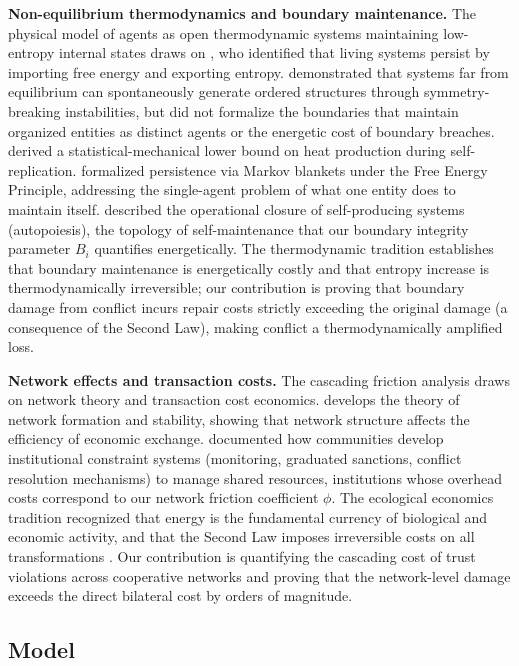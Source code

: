 \documentclass[11pt]{article}
\theoremstyle{plain}
\theoremstyle{definition}
\theoremstyle{remark}
\let\origsubsection\subsection
\renewcommand{\subsection}{\needspace{7\baselineskip}\origsubsection}
\begin{document}
\textbf{Non-equilibrium thermodynamics and boundary maintenance.} The
physical model of agents as open thermodynamic systems maintaining
low-entropy internal states draws on \citet{Schrodinger1944}, who
identified that living systems persist by importing free energy and
exporting entropy. \citet{Prigogine1978} demonstrated that systems far
from equilibrium can spontaneously generate ordered structures through
symmetry-breaking instabilities, but did not formalize the boundaries
that maintain organized entities as distinct agents or the energetic
cost of boundary breaches. \citet{England2013} derived a
statistical-mechanical lower bound on heat production during
self-replication. \citet{Friston2013} formalized persistence via Markov
blankets under the Free Energy Principle, addressing the single-agent
problem of what one entity does to maintain itself. \citet{Maturana1980}
described the operational closure of self-producing systems
(autopoiesis), the topology of self-maintenance that our boundary
integrity parameter \(B_i\) quantifies energetically. The thermodynamic
tradition establishes that boundary maintenance is energetically costly
and that entropy increase is thermodynamically irreversible; our
contribution is proving that boundary damage from conflict incurs repair
costs strictly exceeding the original damage (a consequence of the
Second Law), making conflict a thermodynamically amplified loss.

\textbf{Network effects and transaction costs.} The cascading friction
analysis draws on network theory and transaction cost economics.
\citet{Jackson2008} develops the theory of network formation and
stability, showing that network structure affects the efficiency of
economic exchange. \citet{Ostrom1990} documented how communities develop
institutional constraint systems (monitoring, graduated sanctions,
conflict resolution mechanisms) to manage shared resources, institutions
whose overhead costs correspond to our network friction coefficient
\(\phi\). The ecological economics tradition
\citep{Lotka1922, GeorgescuRoegen1971} recognized that energy is the
fundamental currency of biological and economic activity, and that the
Second Law imposes irreversible costs on all transformations
\citep{GeorgescuRoegen1979}. Our contribution is quantifying the
cascading cost of trust violations across cooperative networks and
proving that the network-level damage exceeds the direct bilateral cost
by orders of magnitude.

\subsection{Model}\label{model-2}
\end{document}
